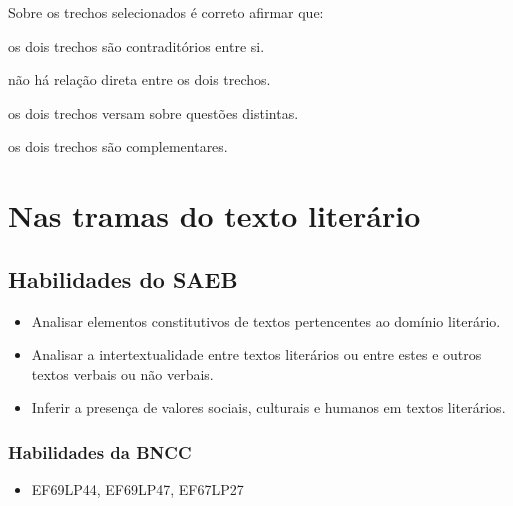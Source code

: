 \pagebreak
Sobre os trechos selecionados é correto afirmar que:

\begin{escolha}

  \item os dois trechos são contraditórios entre si.

  \item não há relação direta entre os dois trechos.

  \item os dois trechos versam sobre questões distintas.

  \item os dois trechos são complementares. 

\end{escolha}

\chapter{Nas tramas do texto literário}

\section*{Habilidades do SAEB}

\begin{itemize}
  
  \item Analisar elementos constitutivos de textos pertencentes ao domínio literário.
  
  \item Analisar a intertextualidade entre textos literários ou entre estes e outros textos 
verbais ou não verbais.
  
  \item Inferir a presença de valores sociais, culturais e humanos em textos literários.

\end{itemize}

\subsection{Habilidades da BNCC}

\begin{itemize}

  \item EF69LP44, EF69LP47, EF67LP27

\end{itemize}

